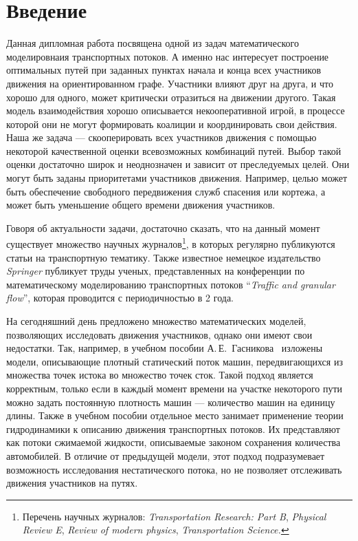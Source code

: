 \documentclass[12pt, a4paper]{article}
\begin{document}
\newpage
\pagestyle{plain}
\tableofcontents{}
\newpage	

\section*{Введение}
Данная дипломная работа посвящена одной из задач математического моделировнаия транспортных потоков. А именно нас интересует построение оптимальных путей при заданных пунктах начала и конца всех участников движения на ориентированном графе. Участники влияют друг на друга, и что хорошо для одного, может критически отразиться на движении другого. Такая модель взаимодействия хорошо описывается некооперативной игрой, в процессе которой они не могут формировать коалиции и координировать свои действия. Наша же задача --- скооперировать всех участников движения с помощью некоторой качественной оценки всевозможных комбинаций путей. Выбор такой оценки достаточно широк и неоднозначен и зависит от преследуемых целей. Они могут быть заданы приоритетами участников движения. Например, целью может быть обеспечение свободного передвижения служб спасения или кортежа, а может быть уменьшение общего времени движения участников.

Говоря об актуальности задачи, достаточно сказать, что на данный момент существует множество научных журналов\footnote{Перечень научных журналов: \textit{Transportation Research: Part B},
	\textit{Physical Review E}, \textit{Review of modern physics}, \textit{Transportation Science.}}, в которых регулярно публикуются статьи на транспортную тематику. Также известное немецкое издательство \textit{Springer} публикует труды ученых, представленных на конференции по математическому моделированию транспортных потоков ``\textit{Traffic and granular flow}'', которая проводится с периодичностью в 2 года.

На сегодняшний день предложено множество математических моделей, позволяющих исследовать движения участников, однако они имеют свои недостатки. Так, например, в учебном пособии А.\,Е.~Гасникова~\cite{book} изложены модели, описывающие плотный статический поток машин, передвигающихся из множества точек истока во множество точек сток. Такой подход является корректным, только если в каждый момент времени на участке некоторого пути можно задать постоянную плотность машин --- количество машин на единицу длины. Также в учебном пособии отдельное место занимает применение теории гидродинамики к описанию движения транспортных потоков. Их представляют как потоки сжимаемой жидкости, описываемые законом сохранения количества автомобилей. В отличие от предыдущей модели, этот подход подразумевает возможность исследования нестатического потока, но не позволяет отслеживать движения участников на путях.
\end{document}
